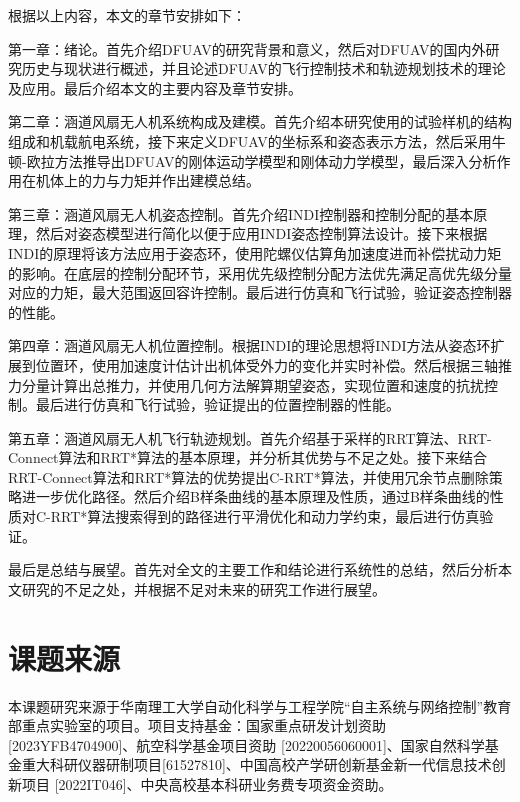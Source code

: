 根据以上内容，本文的章节安排如下：

第一章：绪论。首先介绍DFUAV的研究背景和意义，然后对DFUAV的国内外研究历史与现状进行概述，并且论述DFUAV的飞行控制技术和轨迹规划技术的理论及应用。最后介绍本文的主要内容及章节安排。

第二章：涵道风扇无人机系统构成及建模。首先介绍本研究使用的试验样机的结构组成和机载航电系统，接下来定义DFUAV的坐标系和姿态表示方法，然后采用牛顿-欧拉方法推导出DFUAV的刚体运动学模型和刚体动力学模型，最后深入分析作用在机体上的力与力矩并作出建模总结。

第三章：涵道风扇无人机姿态控制。首先介绍INDI控制器和控制分配的基本原理，然后对姿态模型进行简化以便于应用INDI姿态控制算法设计。接下来根据INDI的原理将该方法应用于姿态环，使用陀螺仪估算角加速度进而补偿扰动力矩的影响。在底层的控制分配环节，采用优先级控制分配方法优先满足高优先级分量对应的力矩，最大范围返回容许控制。最后进行仿真和飞行试验，验证姿态控制器的性能。

第四章：涵道风扇无人机位置控制。根据INDI的理论思想将INDI方法从姿态环扩展到位置环，使用加速度计估计出机体受外力的变化并实时补偿。然后根据三轴推力分量计算出总推力，并使用几何方法解算期望姿态，实现位置和速度的抗扰控制。最后进行仿真和飞行试验，验证提出的位置控制器的性能。

第五章：涵道风扇无人机飞行轨迹规划。首先介绍基于采样的RRT算法、RRT-Connect算法和RRT*算法的基本原理，并分析其优势与不足之处。接下来结合RRT-Connect算法和RRT*算法的优势提出C-RRT*算法，并使用冗余节点删除策略进一步优化路径。然后介绍B样条曲线的基本原理及性质，通过B样条曲线的性质对C-RRT*算法搜索得到的路径进行平滑优化和动力学约束，最后进行仿真验证。

最后是总结与展望。首先对全文的主要工作和结论进行系统性的总结，然后分析本文研究的不足之处，并根据不足对未来的研究工作进行展望。


\section{课题来源}

本课题研究来源于华南理工大学自动化科学与工程学院“自主系统与网络控制”教育部重点实验室的项目。项目支持基金：国家重点研发计划资助 [2023YFB4704900]、航空科学基金项目资助 [20220056060001]、国家自然科学基金重大科研仪器研制项目[61527810]、中国高校产学研创新基金新一代信息技术创新项目 [2022IT046]、中央高校基本科研业务费专项资金资助。